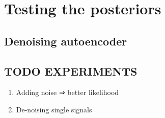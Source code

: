 \section{Testing the posteriors}
\subsection{Denoising autoencoder}

\subsection{TODO EXPERIMENTS}
\begin{enumerate}
    \item Adding noise ⇒ better likelihood
    \item De-noising single signals
\end{enumerate}
